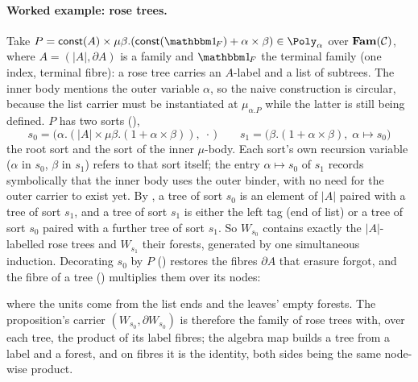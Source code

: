 \paragraph{Worked example: rose trees.}
Take $P = \const(A) \times \mu\beta.(\const(\One_{\!F}) + \alpha \times \beta) \in
\Poly_{\alpha}$ over $\mathbf{Fam}(\mathcal{C})$, where $A = (|A|, \partial A)$ is a family and $\One_{\!F}$ the
terminal family (one index, terminal fibre): a rose tree carries an $A$-label and a list of subtrees.
The inner body mentions the outer variable $\alpha$, so
the naive construction is circular, because the list carrier must be instantiated at $\mu_{\alpha.P}$
while the latter is still being defined. $P$ has two sorts (),
\[
  s_0 = \bigl(\alpha.(|A| \times \mu\beta.(1 + \alpha \times \beta)),\; \cdot\,\bigr) \qquad
  s_1 = \bigl(\beta.(1 + \alpha \times \beta),\; \alpha \mapsto s_0\bigr)
\]
the root sort and the sort of the inner $\mu$-body. Each sort's own recursion variable ($\alpha$
in $s_0$, $\beta$ in $s_1$) refers to that sort itself; the entry $\alpha \mapsto s_0$ of $s_1$
records symbolically that the inner body uses the outer binder, with no need for the outer carrier
to exist yet. By , a tree of sort $s_0$ is an element of $|A|$ paired
with a tree of sort $s_1$, and a tree of sort $s_1$ is either the left tag (end of list) or a tree
of sort $s_0$ paired with a further tree of sort $s_1$. So $W_{s_0}$ contains exactly the
$|A|$-labelled rose trees and $W_{s_1}$ their forests, generated by one simultaneous induction.
Decorating $s_0$ by $P$
() restores the fibres $\partial A$ that erasure forgot, and the
fibre of a tree () multiplies them over its nodes:
\begin{center}
\qquad{}
\end{center}
\noindent
where the units come from the list ends and the leaves' empty forests. The proposition's
carrier $(W_{s_0}, \partial W_{s_0})$ is therefore the family of rose trees with, over each tree,
the product of its label fibres; the algebra map builds a tree from a label and a forest, and on
fibres it is the identity, both sides being the same node-wise product.

